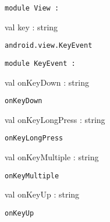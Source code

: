 \documentclass[11pt]{article}
\begin{document}
\begin{ocamldoccode}
{\tt{module }}{\tt{View}}{\tt{ : }}\end{ocamldoccode}
\label{module:Android.View}

\begin{ocamldocsigend}


\label{val:Android.View.key}\begin{ocamldoccode}
val key : string
\end{ocamldoccode}
\begin{ocamldocdescription}
{\tt{android.view.KeyEvent}}


\end{ocamldocdescription}


\begin{ocamldoccode}
{\tt{module }}{\tt{KeyEvent}}{\tt{ : }}\end{ocamldoccode}
\label{module:Android.View.KeyEvent}
\begin{ocamldocsigend}


\label{val:Android.View.KeyEvent.onKeyDown}\begin{ocamldoccode}
val onKeyDown : string
\end{ocamldoccode}
\begin{ocamldocdescription}
{\tt{onKeyDown}}


\end{ocamldocdescription}


\label{val:Android.View.KeyEvent.onKeyLongPress}\begin{ocamldoccode}
val onKeyLongPress : string
\end{ocamldoccode}
\begin{ocamldocdescription}
{\tt{onKeyLongPress}}


\end{ocamldocdescription}


\label{val:Android.View.KeyEvent.onKeyMultiple}\begin{ocamldoccode}
val onKeyMultiple : string
\end{ocamldoccode}
\begin{ocamldocdescription}
{\tt{onKeyMultiple}}


\end{ocamldocdescription}


\label{val:Android.View.KeyEvent.onKeyUp}\begin{ocamldoccode}
val onKeyUp : string
\end{ocamldoccode}
\begin{ocamldocdescription}
{\tt{onKeyUp}}



\end{ocamldocdescription}
\end{ocamldocsigend}
\end{ocamldocsigend}
\end{document}
